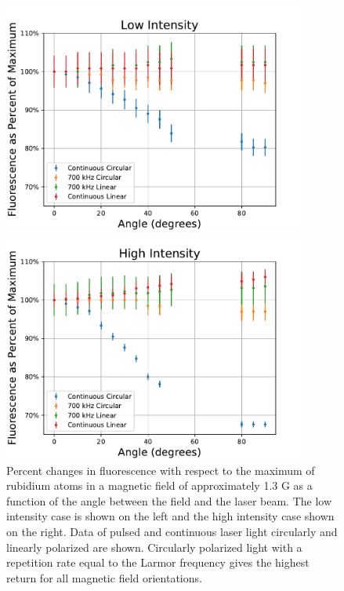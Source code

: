 \begin{figure}[htb]
	\centering
	\begin{minipage}{.48\textwidth}
	\centering
		\includegraphics[width=0.9\textwidth]{../../MRPData/April16/togetherscaled.pdf}
	\end{minipage}
	\begin{minipage}{.48\textwidth}
	\centering
		\includegraphics[width=0.9\textwidth]{../../MRPData/MAR24/togetherscaled.pdf}
	\end{minipage}
	\caption{Percent changes in fluorescence with respect to the maximum of rubidium atoms in a magnetic field of approximately 1.3 G as a function of the angle between the field and the laser beam. The low intensity case is shown on the left and the high intensity case shown on the right. Data of pulsed and continuous laser light circularly and linearly polarized are shown. Circularly polarized light with a repetition rate equal to the Larmor frequency gives the highest return for all magnetic field orientations.}
	\label{fig:flvanglescaled}
\end{figure}

